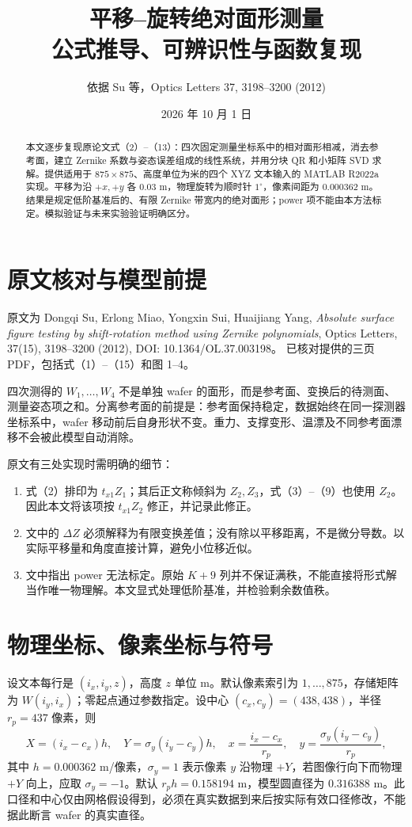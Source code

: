 \documentclass[UTF8,a4paper,zihao=-4]{ctexart}
\title{平移--旋转绝对面形测量\\公式推导、可辨识性与函数复现}
\author{依据 Su 等，Optics Letters 37, 3198--3200 (2012)}
\date{2026 年 10 月 1 日}
\begin{document}
\maketitle
\begin{abstract}
本文逐步复现原论文式（2）--（13）：四次固定测量坐标系中的相对面形相减，消去参考面，建立 Zernike 系数与姿态误差组成的线性系统，并用分块 QR 和小矩阵 SVD 求解。提供适用于 $875\times875$、高度单位为米的四个 XYZ 文本输入的 MATLAB R2022a 实现。平移为沿 $+x,+y$ 各 $0.03$ m，物理旋转为顺时针 $1^\circ$，像素间距为 $0.000362$ m。结果是规定低阶基准后的、有限 Zernike 带宽内的绝对面形；power 项不能由本方法标定。模拟验证与未来实验验证明确区分。
\end{abstract}
\setcounter{tocdepth}{1}
\begingroup\small\tableofcontents\endgroup
\newpage
\section{原文核对与模型前提}
原文为 Dongqi Su, Erlong Miao, Yongxin Sui, Huaijiang Yang,
\emph{Absolute surface figure testing by shift-rotation method using Zernike polynomials},
Optics Letters, 37(15), 3198--3200 (2012), DOI: 10.1364/OL.37.003198。
已核对提供的三页 PDF，包括式（1）--（15）和图 1--4。

四次测得的 $W_1,\ldots,W_4$ 不是单独 wafer 的面形，而是参考面、变换后的待测面、测量姿态项之和。分离参考面的前提是：参考面保持稳定，数据始终在同一探测器坐标系中，wafer 移动前后自身形状不变。重力、支撑变形、温漂及不同参考面漂移不会被此模型自动消除。

原文有三处实现时需明确的细节：
\begin{enumerate}
\item 式（2）排印为 $t_{x1}Z_1$；其后正文称倾斜为 $Z_2,Z_3$，式（3）--（9）也使用 $Z_2$。因此本文将该项按 $t_{x1}Z_2$ 修正，并记录此修正。
\item 文中的 $\Delta Z$ 必须解释为有限变换差值；没有除以平移距离，不是微分导数。以实际平移量和角度直接计算，避免小位移近似。
\item 文中指出 power 无法标定。原始 $K+9$ 列并不保证满秩，不能直接将形式解当作唯一物理解。本文显式处理低阶基准，并检验剩余数值秩。
\end{enumerate}

\section{物理坐标、像素坐标与符号}
设文本每行是 $(i_x,i_y,z)$，高度 $z$ 单位 m。默认像素索引为 $1,\ldots,875$，存储矩阵为 $W(i_y,i_x)$；零起点通过参数指定。设中心 $(c_x,c_y)=(438,438)$，半径 $r_p=437$ 像素，则
\begin{equation}
X=(i_x-c_x)h,\quad Y=\sigma_y(i_y-c_y)h,\quad
x=\frac{i_x-c_x}{r_p},\quad y=\frac{\sigma_y(i_y-c_y)}{r_p},
\end{equation}
其中 $h=0.000362$ m/像素，$\sigma_y=1$ 表示像素 $y$ 沿物理 $+Y$，若图像行向下而物理 $+Y$ 向上，应取 $\sigma_y=-1$。默认 $r_ph=0.158194$ m，模型圆直径为 $0.316388$ m。此口径和中心仅由网格假设得到，必须在真实数据到来后按实际有效口径修改，不能据此断言 wafer 的真实直径。
\end{document}
